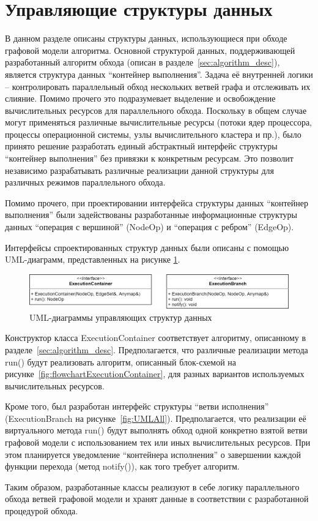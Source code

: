 \section{Управляющие структуры данных}\label{sec:execution_structures}
В данном разделе описаны структуры данных, использующиеся при обходе графовой модели алгоритма. Основной структурой данных, поддерживающей разработанный алгоритм обхода (описан в разделе~\ref{sec:algorithm_desc}), является структура данных ``контейнер выполнения''. Задача её внутренней логики -- контролировать параллельный обход нескольких ветвей графа и отслеживать их слияние. Помимо прочего это подразумевает выделение и освобождение вычислительных ресурсов для параллельного обхода. Поскольку в общем случае могут применяться различные вычислительные ресурсы (потоки ядер процессора, процессы операционной системы, узлы вычислительного кластера и пр.), было принято решение разработать единый абстрактный интерфейс структуры ``контейнер выполнения'' без привязки к конкретным ресурсам. Это позволит независимо разрабатывать различные реализации данной структуры для различных режимов параллельного обхода.

Помимо прочего, при проектировании интерфейса структуры данных ``контейнер выполнения'' были задействованы разработанные информационные структуры данных ``операция с вершиной'' (\textsf{NodeOp}) и ``операция с ребром'' (\textsf{EdgeOp}).

Интерфейсы спроектированных структур данных были описаны с помощью UML-диаграмм, представленных на рисунке \ref{fig:UMLExecution}.
\begin{figure}[!ht]
    \centering
    \includegraphics[width=\textwidth]{figures/UML.all.png}
    \caption{UML-диаграммы управляющих структур данных}
    \label{fig:UMLExecution}
\end{figure}

Конструктор класса \textsf{ExecutionContainer} соответствует алгоритму, описанному в разделе~\ref{sec:algorithm_desc}. Предполагается, что различные реализации метода \textsf{run()} будут реализовать алгоритм, описанный блок-схемой на рисунке~\ref{fig:flowchartExecutionContainer}, для разных вариантов используемых вычислительных ресурсов.

Кроме того, был разработан интерфейс структуры ``ветви исполнения'' (\textsf{ExecutionBranch} на рисунке~\ref{fig:UMLAll}). Предполагается, что реализации её виртуального метода \textsf{run()} будут выполнять обход одной конкретно взятой ветви графовой модели с использованием тех или иных вычислительных ресурсов. При этом планируется уведомление ``контейнера исполнения'' о завершении каждой функции перехода (метод \textsf{notify()}), как того требует алгоритм.

Таким образом, разработанные классы реализуют в себе логику параллельного обхода ветвей графовой модели и хранят данные в соответствии с разработанной процедурой обхода.